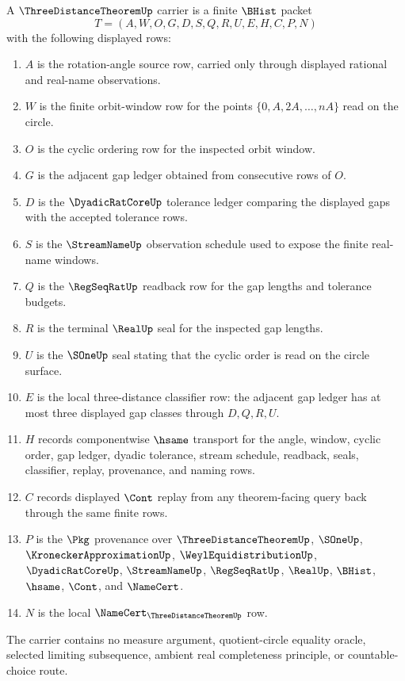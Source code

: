 \begin{definition}
\label{def:three-distance-theorem-carrier}
A $\ThreeDistanceTheoremUp$ carrier is a finite $\BHist$ packet
$$
T=(A,W,O,G,D,S,Q,R,U,E,H,C,P,N)
$$
with the following displayed rows:
\begin{enumerate}
\item $A$ is the rotation-angle source row, carried only through displayed rational and real-name observations.
\item $W$ is the finite orbit-window row for the points $\{0,A,2A,\ldots,nA\}$ read on the circle.
\item $O$ is the cyclic ordering row for the inspected orbit window.
\item $G$ is the adjacent gap ledger obtained from consecutive rows of $O$.
\item $D$ is the $\DyadicRatCoreUp$ tolerance ledger comparing the displayed gaps with the accepted tolerance rows.
\item $S$ is the $\StreamNameUp$ observation schedule used to expose the finite real-name windows.
\item $Q$ is the $\RegSeqRatUp$ readback row for the gap lengths and tolerance budgets.
\item $R$ is the terminal $\RealUp$ seal for the inspected gap lengths.
\item $U$ is the $\SOneUp$ seal stating that the cyclic order is read on the circle surface.
\item $E$ is the local three-distance classifier row: the adjacent gap ledger has at most three displayed gap classes through $D,Q,R,U$.
\item $H$ records componentwise $\hsame$ transport for the angle, window, cyclic order, gap ledger, dyadic tolerance, stream schedule, readback, seals, classifier, replay, provenance, and naming rows.
\item $C$ records displayed $\Cont$ replay from any theorem-facing query back through the same finite rows.
\item $P$ is the $\Pkg$ provenance over $\ThreeDistanceTheoremUp$, $\SOneUp$, $\KroneckerApproximationUp$, $\WeylEquidistributionUp$, $\DyadicRatCoreUp$, $\StreamNameUp$, $\RegSeqRatUp$, $\RealUp$, $\BHist$, $\hsame$, $\Cont$, and $\NameCert$.
\item $N$ is the local $\NameCert_{\ThreeDistanceTheoremUp}$ row.
\end{enumerate}
The carrier contains no measure argument, quotient-circle equality oracle, selected limiting subsequence, ambient real completeness principle, or countable-choice route.
\end{definition}

